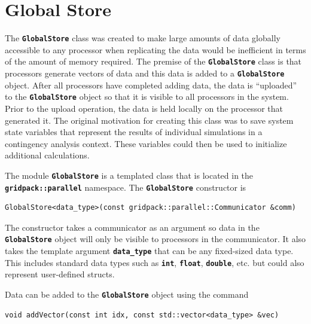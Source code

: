 \section{Global Store}

The \texttt{\textbf{GlobalStore}} class was created to make large amounts of data globally accessible to any processor when replicating the data would be inefficient in terms of the amount of memory required. The premise of the \texttt{\textbf{GlobalStore}} class is that processors generate vectors of data and this data is added to a \texttt{\textbf{GlobalStore}} object. After all processors have completed adding data, the data is ``uploaded'' to the \texttt{\textbf{GlobalStore}} object so that it is visible to all processors in the system. Prior to the upload operation, the data is held locally on the processor that generated it. The original motivation for creating this class was to save system state variables that represent the results of individual simulations in a contingency analysis context. These variables could then be used to initialize additional calculations.

The module \texttt{\textbf{GlobalStore}} is a templated class that is located in the \texttt{\textbf{gridpack::parallel}} namespace. The \texttt{\textbf{GlobalStore}} constructor is

{
\color{red}
\begin{Verbatim}[fontseries=b]
GlobalStore<data_type>(const gridpack::parallel::Communicator &comm)
\end{Verbatim}
}

The constructor takes a communicator as an argument so data in the \texttt{\textbf{GlobalStore}} object will only be visible to processors in the communicator. It also takes the template argument \texttt{\textbf{data\_type}} that can be any fixed-sized data type. This includes standard data types such as \texttt{\textbf{int}}, \texttt{\textbf{float}}, \texttt{\textbf{double}}, etc. but could also represent user-defined structs.

Data can be added to the \texttt{\textbf{GlobalStore}} object using the command

{
\color{red}
\begin{Verbatim}[fontseries=b]
void addVector(const int idx, const std::vector<data_type> &vec)
\end{Verbatim}
}

